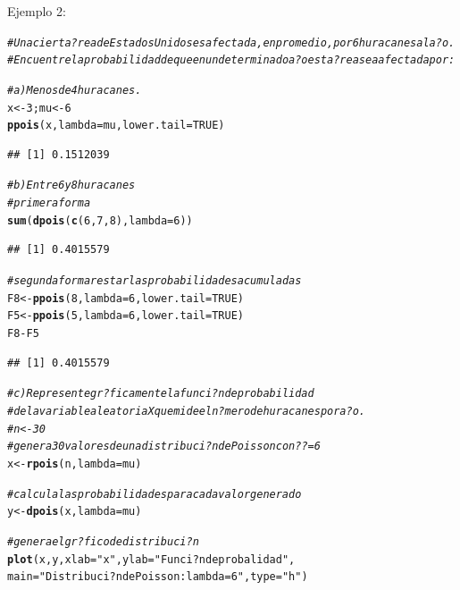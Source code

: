 \documentclass[10pt,a4paper]{article}\usepackage[]{graphicx}\usepackage[]{color}
\makeatletter
\newcommand{\hlnum}[1]{\textcolor[rgb]{0.686,0.059,0.569}{#1}}%
\newcommand{\hlstr}[1]{\textcolor[rgb]{0.192,0.494,0.8}{#1}}%
\newcommand{\hlcom}[1]{\textcolor[rgb]{0.678,0.584,0.686}{\textit{#1}}}%
\newcommand{\hlopt}[1]{\textcolor[rgb]{0,0,0}{#1}}%
\newcommand{\hlstd}[1]{\textcolor[rgb]{0.345,0.345,0.345}{#1}}%
\newcommand{\hlkwb}[1]{\textcolor[rgb]{0.69,0.353,0.396}{#1}}%
\newcommand{\hlkwc}[1]{\textcolor[rgb]{0.333,0.667,0.333}{#1}}%
\newcommand{\hlkwd}[1]{\textcolor[rgb]{0.737,0.353,0.396}{\textbf{#1}}}%
\newenvironment{kframe}{%
 \def\at@end@of@kframe{}%
 \ifinner\ifhmode%
  \def\at@end@of@kframe{\end{minipage}}%
  \begin{minipage}{\columnwidth}%
 \fi\fi%
 \def\FrameCommand##1{\hskip\@totalleftmargin \hskip-\fboxsep
 \colorbox{shadecolor}{##1}\hskip-\fboxsep
     \hskip-\linewidth \hskip-\@totalleftmargin \hskip\columnwidth}%
 \MakeFramed {\advance\hsize-\width
   \@totalleftmargin\z@ \linewidth\hsize
   \@setminipage}}%
 {\par\unskip\endMakeFramed%
 \at@end@of@kframe}
\newenvironment{knitrout}{}{} %
\makeatother
\begin{document}
Ejemplo 2:
\begin{knitrout}
\color{fgcolor}\begin{kframe}
\begin{alltt}
\hlcom{#Una cierta ?rea de Estados Unidos es afectada, en promedio, por 6 huracanes al a?o. }
\hlcom{#Encuentre la probabilidad de que en un determinado a?o esta ?rea sea afectada por: }

\hlcom{#a) Menos de 4 huracanes.}
\hlstd{x} \hlkwb{<-} \hlnum{3}\hlstd{; mu} \hlkwb{<-} \hlnum{6}
\hlkwd{ppois}\hlstd{(x,} \hlkwc{lambda} \hlstd{= mu,} \hlkwc{lower.tail}\hlstd{=}\hlnum{TRUE}\hlstd{)}
\end{alltt}
\begin{verbatim}
## [1] 0.1512039
\end{verbatim}
\begin{alltt}
\hlcom{#b) Entre 6 y 8 huracanes}
\hlcom{#primera forma }
\hlkwd{sum}\hlstd{(}\hlkwd{dpois}\hlstd{(}\hlkwd{c}\hlstd{(}\hlnum{6}\hlstd{,}\hlnum{7}\hlstd{,}\hlnum{8}\hlstd{),}\hlkwc{lambda} \hlstd{=} \hlnum{6}\hlstd{))}
\end{alltt}
\begin{verbatim}
## [1] 0.4015579
\end{verbatim}
\begin{alltt}
\hlcom{# segunda forma restar las probabilidades acumuladas}
\hlstd{F8} \hlkwb{<-} \hlkwd{ppois}\hlstd{(}\hlnum{8}\hlstd{,} \hlkwc{lambda} \hlstd{=} \hlnum{6}\hlstd{,} \hlkwc{lower.tail}\hlstd{=}\hlnum{TRUE}\hlstd{)}
\hlstd{F5} \hlkwb{<-} \hlkwd{ppois}\hlstd{(}\hlnum{5}\hlstd{,}\hlkwc{lambda} \hlstd{=} \hlnum{6}\hlstd{,} \hlkwc{lower.tail}\hlstd{=}\hlnum{TRUE}\hlstd{)}
\hlstd{F8} \hlopt{-} \hlstd{F5}
\end{alltt}
\begin{verbatim}
## [1] 0.4015579
\end{verbatim}
\begin{alltt}
\hlcom{#c) Represente gr?ficamente la funci?n de probabilidad }
\hlcom{#de la variable aleatoria X que mide el n?mero de huracanes por a?o.}
\hlcom{#n <- 30 }
\hlcom{#genera 30 valores de una distribuci?n de Poisson con ??=6}
\hlstd{x} \hlkwb{<-} \hlkwd{rpois}\hlstd{(n,} \hlkwc{lambda}\hlstd{=mu)}

\hlcom{#calcula las probabilidades para cada valor generado }
\hlstd{y} \hlkwb{<-} \hlkwd{dpois}\hlstd{(x,} \hlkwc{lambda}\hlstd{=mu)}

\hlcom{#genera el gr?fico de distribuci?n }
\hlkwd{plot}\hlstd{(x, y,} \hlkwc{xlab}\hlstd{=}\hlstr{"x"}\hlstd{,} \hlkwc{ylab}\hlstd{=}\hlstr{"Funci?n de probalidad"}\hlstd{,}
\hlkwc{main}\hlstd{=}\hlstr{"Distribuci?n de Poisson: lambda = 6"}\hlstd{,}\hlkwc{type}\hlstd{=}\hlstr{"h"}\hlstd{)}


\end{alltt}
\end{kframe}
\end{knitrout}
\end{document}
